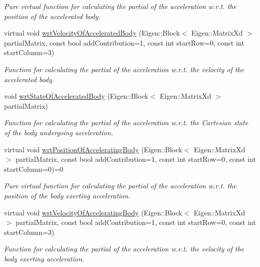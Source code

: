\begin{DoxyCompactItemize}
\begin{DoxyCompactList}\small\item\em Pure virtual function for calculating the partial of the acceleration w.\+r.\+t. the position of the accelerated body. \end{DoxyCompactList}\item 
virtual void \hyperlink{classtudat_1_1acceleration__partials_1_1AccelerationPartial_ad3bb8ec281acf660baed8eb5127fcf5d}{wrt\+Velocity\+Of\+Accelerated\+Body} (Eigen\+::\+Block$<$ Eigen\+::\+Matrix\+Xd $>$ partial\+Matrix, const bool add\+Contribution=1, const int start\+Row=0, const int start\+Column=3)
\begin{DoxyCompactList}\small\item\em Function for calculating the partial of the acceleration w.\+r.\+t. the velocity of the accelerated body. \end{DoxyCompactList}\item 
void \hyperlink{classtudat_1_1acceleration__partials_1_1AccelerationPartial_a0576a63608bc8bee1da8bf2aea0ea7b6}{wrt\+State\+Of\+Accelerated\+Body} (Eigen\+::\+Block$<$ Eigen\+::\+Matrix\+Xd $>$ partial\+Matrix)
\begin{DoxyCompactList}\small\item\em Function for calculating the partial of the acceleration w.\+r.\+t. the Cartesian state of the body undergoing acceleration. \end{DoxyCompactList}\item 
virtual void \hyperlink{classtudat_1_1acceleration__partials_1_1AccelerationPartial_a779c9c208d2054d8425178f4ea8f6021}{wrt\+Position\+Of\+Accelerating\+Body} (Eigen\+::\+Block$<$ Eigen\+::\+Matrix\+Xd $>$ partial\+Matrix, const bool add\+Contribution=1, const int start\+Row=0, const int start\+Column=0)=0
\begin{DoxyCompactList}\small\item\em Pure virtual function for calculating the partial of the acceleration w.\+r.\+t. the position of the body exerting acceleration. \end{DoxyCompactList}\item 
virtual void \hyperlink{classtudat_1_1acceleration__partials_1_1AccelerationPartial_ab411157f1ab0d7b8bdcb771024b4f5a9}{wrt\+Velocity\+Of\+Accelerating\+Body} (Eigen\+::\+Block$<$ Eigen\+::\+Matrix\+Xd $>$ partial\+Matrix, const bool add\+Contribution=1, const int start\+Row=0, const int start\+Column=3)
\begin{DoxyCompactList}\small\item\em Function for calculating the partial of the acceleration w.\+r.\+t. the velocity of the body exerting acceleration. \end{DoxyCompactList}\item 

\end{DoxyCompactItemize}
